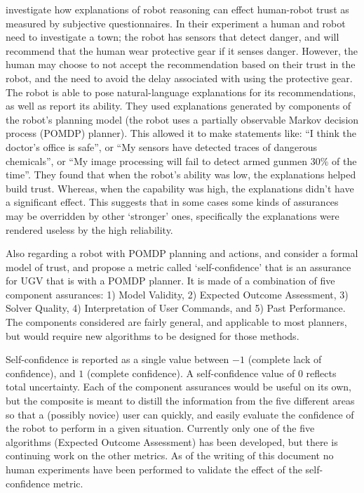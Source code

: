 \citet{Wang2016-id} investigate how explanations of robot reasoning can effect human-robot trust as measured by subjective questionnaires. In their experiment a human and robot need to investigate a town; the robot has sensors that detect danger, and will recommend that the human wear protective gear if it senses danger. However, the human may choose to not accept the recommendation based on their trust in the robot, and the need to avoid the delay associated with using the protective gear. The robot is able to pose natural-language explanations for its recommendations, as well as report its ability. They used explanations generated by components of the robot's planning model (the robot uses a partially observable Markov decision process (POMDP) planner). This allowed it to make statements like: ``I think the doctor's office is safe'', or ``My sensors have detected traces of dangerous chemicals'', or ``My image processing will fail to detect armed gunmen 30\% of the time''. They found that when the robot's ability was low, the explanations helped build trust. Whereas, when the capability was high, the explanations didn't have a significant effect. This suggests that in some cases some kinds of assurances may be overridden by other `stronger' ones, specifically the explanations were rendered useless by the high reliability. 

Also regarding a robot with POMDP planning and actions, \citet{Aitken2016-fb} and \citet{Aitken2016-cv} consider a formal model of trust, and propose a metric called `self-confidence' that is an assurance for UGV that is with a  POMDP planner. It is made of a combination of five component assurances: 1) Model Validity, 2) Expected Outcome Assessment, 3) Solver Quality, 4) Interpretation of User Commands, and 5) Past Performance. The components considered are fairly general, and applicable to most planners, but would require new algorithms to be designed for those methods.

Self-confidence is reported as a single value between $-1$ (complete lack of confidence), and $1$ (complete confidence). A self-confidence value of $0$ reflects total uncertainty. Each of the component assurances would be useful on its own, but the composite is meant to distill the information from the five different areas so that a (possibly novice) user can quickly, and easily evaluate the confidence of the robot to perform in a given situation. Currently only one of the five algorithms (Expected Outcome Assessment) has been developed, but there is continuing work on the other metrics. As of the writing of this document no human experiments have been performed to validate the effect of the self-confidence metric.

